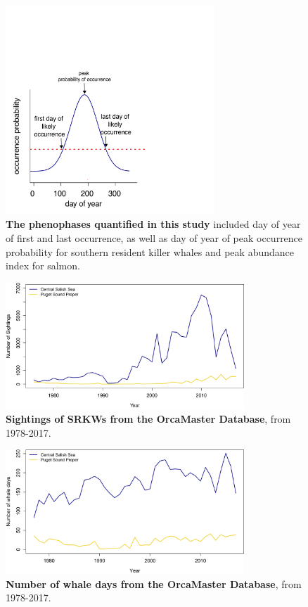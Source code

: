 \documentclass{article}
\begin{document}
\begin{figure}[!hp]
\includegraphics[width=0.7\textwidth]{../analyses/figures/phenophases.pdf}
\caption{\textbf{The phenophases quantified in this study} included day of year of first and last occurrence, as well as day of year of peak occurrence probability for southern resident killer whales and peak abundance index for salmon.}
\label{fig:ctcalb}
\end{figure}


\begin{figure}[!hp]
\includegraphics[width=0.8\textwidth]{../analyses/figures/OrcaPhenPlots/numsights_1976_2regs.png} 
\caption{\textbf{Sightings of SRKWs from the OrcaMaster Database}, from 1978-2017. }
\label{fig:sights}
\end{figure}


\begin{figure}[!hp]
\includegraphics[width=0.8\textwidth]{../analyses/figures/OrcaPhenPlots/whaledays_assumeSRKW2regs.png} 
\caption{\textbf{Number of whale days from the OrcaMaster Database}, from 1978-2017. }
\label{fig:wdays}
\end{figure}
\end{document}
